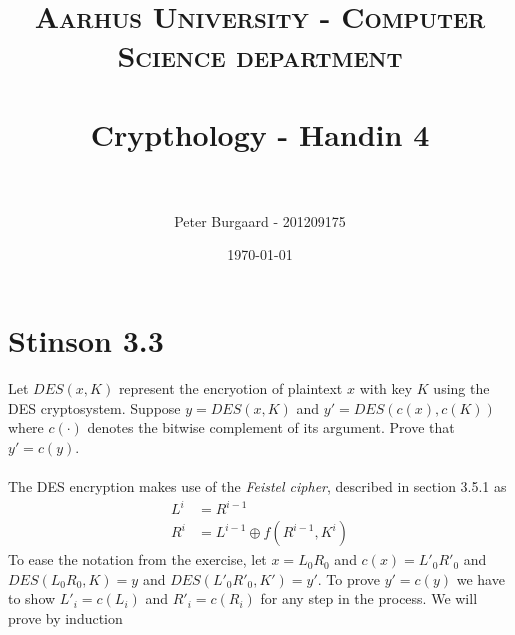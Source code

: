 \documentclass[paper=a4, fontsize=11pt]{scrartcl} %
\title{	
	\normalfont \normalsize 
	\textsc{Aarhus University - Computer Science department} \\ [25pt] %
	\horrule{0.5pt} \\[0.4cm] %
	\huge Crypthology - Handin 4 \\ %
	\horrule{2pt} \\[0.5cm] %
}
\author{Peter Burgaard - 201209175} %
\date{\normalsize\today} %
\numberwithin{equation}{section} %
\numberwithin{figure}{section} %
\numberwithin{table}{section} %
\begin{document}
	
	\maketitle %
	
	\section{Stinson 3.3}
	Let $DES(x,K)$ represent the encryotion of plaintext $x$ with key $K$ using the DES cryptosystem. Suppose $y=DES(x,K)$ and $y'=DES(c(x),c(K))$ where $c(\cdot)$ denotes the bitwise complement of its argument. Prove that $y'=c(y)$.  \\ \\
	The DES encryption makes use of the \textit{Feistel cipher}, described in section 3.5.1 as
	\begin{align*}
	L^i &= R^{i-1} \\
	R^i &= L^{i-1}\oplus f(R^{i-1},K^i)
	\end{align*}
	To ease the notation from the exercise, let $x=L_0 R_0$ and $c(x)=L'_0 R'_0$ and $DES(L_0 R_0,K)=y$ and $DES(L'_0 R'_0, K')=y'$. To prove $y'=c(y)$ we have to show $L'_i=c(L_i)$ and $R'_i=c(R_i)$ for any step in the process. We will prove by induction
	
\end{document}
